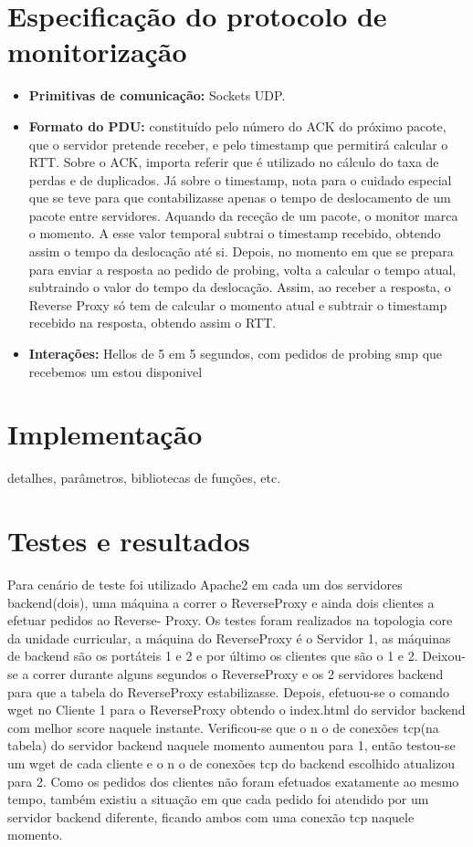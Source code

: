\documentclass{llncs}
\begin{document}
\section{Especificação do protocolo de monitorização}

\begin{itemize}
	\setlength\itemsep{1em}
\item \textbf{Primitivas de comunicação:} Sockets UDP.
\item \textbf{Formato do PDU:} constituído pelo número do ACK do próximo pacote, que o servidor pretende receber, e pelo timestamp que permitirá calcular o RTT. Sobre o ACK, importa referir que é utilizado no cálculo do taxa de perdas e de duplicados. Já sobre o timestamp, nota para o cuidado especial que se teve para que contabilizasse apenas o tempo de deslocamento de um pacote entre servidores. Aquando da receção de um pacote, o monitor marca o momento. A esse valor temporal subtrai o timestamp recebido, obtendo assim o tempo da deslocação até si. Depois, no momento em que se prepara para enviar a resposta ao pedido de probing, volta a calcular o tempo atual, subtraindo o valor do tempo da deslocação. Assim, ao receber a resposta, o Reverse Proxy só tem de calcular o momento atual e subtrair o timestamp recebido na resposta, obtendo assim o RTT.
\item \textbf{Interações:} Hellos de 5 em 5 segundos, com pedidos de probing smp que recebemos um estou disponivel
\end{itemize}

\newpage

\section{Implementação}

detalhes, parâmetros, bibliotecas de funções, etc.

\newpage

\section{Testes e resultados}

Para cenário de teste foi utilizado Apache2 em cada um dos servidores backend(dois),
uma máquina a correr o ReverseProxy e ainda dois clientes a efetuar pedidos ao Reverse-
Proxy. Os testes foram realizados na topologia core da unidade curricular, a máquina do
ReverseProxy é o Servidor 1, as máquinas de backend são os portáteis 1 e 2 e por último
os clientes que são o 1 e 2.
Deixou-se a correr durante alguns segundos o ReverseProxy e os 2 servidores backend
para que a tabela do ReverseProxy estabilizasse. Depois, efetuou-se o comando wget no
Cliente 1 para o ReverseProxy obtendo o index.html do servidor backend com melhor score
naquele instante. Verificou-se que o n o de conexões tcp(na tabela) do servidor backend
naquele momento aumentou para 1, então testou-se um wget de cada cliente e o n o de
conexões tcp do backend escolhido atualizou para 2. Como os pedidos dos clientes não
foram efetuados exatamente ao mesmo tempo, também existiu a situação em que cada
pedido foi atendido por um servidor backend diferente, ficando ambos com uma conexão
tcp naquele momento.
\end{document}
